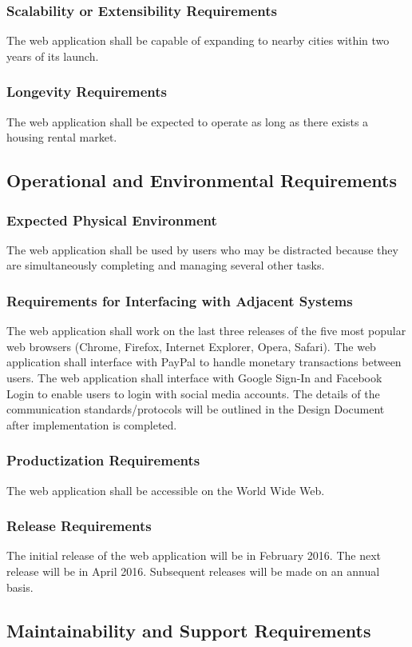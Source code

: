 \documentclass[12pt, titlepage]{article}
\begin{document}
{\subsubsection{Scalability or Extensibility Requirements}
The web application shall be capable of expanding to nearby cities within two 
years of its launch.
\subsubsection{Longevity Requirements}
The web application shall be expected to operate as long as there exists a 
housing rental market.
\subsection{Operational and Environmental Requirements}
\subsubsection{Expected Physical Environment}
The web application shall be used by users who may be distracted because they 
are simultaneously completing and managing several other tasks. 
\subsubsection{Requirements for Interfacing with Adjacent Systems}
The web application shall work on the last three releases of the five most 
popular web browsers (Chrome, Firefox, Internet Explorer, Opera, Safari). The 
web application shall interface with PayPal to handle monetary transactions 
between users. The web application shall interface with Google Sign-In and 
Facebook Login to enable users to login with social media accounts. The details 
of the communication standards/protocols will be outlined in the Design Document 
after implementation is completed.
\subsubsection{Productization Requirements}
The web application shall be accessible on the World Wide Web.
\subsubsection{Release Requirements}
The initial release of the web application will be in February 2016. The next 
release will be in April 2016. Subsequent releases will be made on an annual 
basis.
\subsection{Maintainability and Support Requirements}
}
\end{document}
